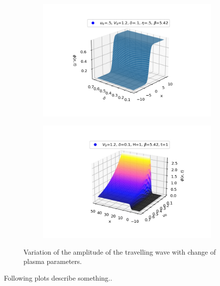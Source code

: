 \documentclass[a4paper, 12pt]{article}
\begin{document}
\begin{figure}[h]
\begin{subfigure}{0.5\textwidth}
    \includegraphics[scale=0.5]{tanh_phivsDelta.png}
    \label{plot-delta}
    \end{subfigure}
    \begin{subfigure}{0.5\textwidth}
    \centering
    \includegraphics[scale=0.5]{tanh_phivsU0.jpg}
    \label{plot-u0}
    \end{subfigure}
    \caption{Variation of the amplitude of the travelling wave with change of plasma parameters.}
    \label{plot-phiVSvars1}
\end{figure}
Following plots describe something..
\end{document}
